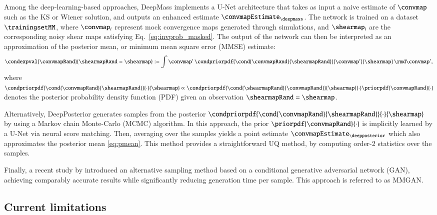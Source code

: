 \documentclass{aa}
\begin{document}
Among the deep-learning-based approaches, DeepMass \citep{Jeffrey2020} implements a U-Net architecture that takes as input a naive estimate of $\convmap$ such as the KS or Wiener solution, and outputs an enhanced estimate $\convmapEstimate_{\deepmass}$. The network is trained on a dataset $\trainingsetMM$, where $\convmap_i$ represent mock convergence maps generated through simulations, and $\shearmap_i$ are the corresponding noisy shear maps satisfying Eq.~\eqref{eq:invprob_masked}. The output of the network can then be interpreted as an approximation of the posterior mean, or minimum mean square error (MMSE) estimate:
\begin{equation}
    \condexpval{\convmapRand}{\shearmapRand=\shearmap} := \int \convmap' \, \condpriorpdf{\cond{\convmapRand}{\shearmapRand}}{\convmap'}{\shearmap} \, \rmd\convmap',
    \label{eq:pmean}
\end{equation}
where $\condpriorpdf{\cond{\convmapRand}{\shearmapRand}}{\cdot}{\shearmap} \propto \condpriorpdf{\cond{\shearmapRand}{\convmapRand}}{\shearmap}{\cdot} \priorpdf{\convmapRand}{\cdot}$ denotes the posterior probability density function (PDF) given an observation $\shearmapRand = \shearmap$.

Alternatively, DeepPosterior \citep{Remy2023} generates samples from the posterior $\condpriorpdf{\cond{\convmapRand}{\shearmapRand}}{\cdot}{\shearmap}$ by using a Markov chain Monte-Carlo (MCMC) algorithm. In this approach, the prior $\priorpdf{\convmapRand}{\cdot}$ is implicitly learned by a U-Net via neural score matching. Then, averaging over the samples yields a point estimate $\convmapEstimate_{\deepposterior}$ which also approximates the posterior mean \eqref{eq:pmean}. This method provides a straightforward UQ method, by computing order-2 statistics over the samples.

Finally, a recent study by \citet{Whitney2024} introduced an alternative sampling method based on a conditional generative adversarial network (GAN), achieving comparably accurate results while significantly reducing generation time per sample. This approach is referred to as MMGAN.
 

\subsection{Current limitations}
\label{subsec:background_limitations}
\end{document}
